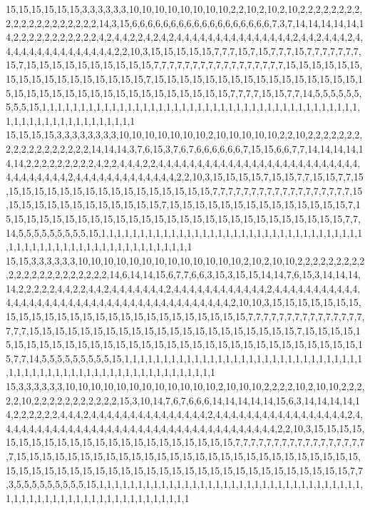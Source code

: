 15,15,15,15,15,15,3,3,3,3,3,3,10,10,10,10,10,10,10,10,2,2,10,2,10,2,10,2,2,2,2,2,2,2,2,2,2,2,2,2,2,2,2,2,2,2,2,14,3,15,6,6,6,6,6,6,6,6,6,6,6,6,6,6,6,6,6,6,7,3,7,14,14,14,14,14,14,2,2,2,2,2,2,2,2,2,2,2,4,2,4,4,2,2,4,2,4,2,4,4,4,4,4,4,4,4,4,4,4,4,4,4,4,2,4,4,2,4,4,4,2,4,4,4,4,4,4,4,4,4,4,4,4,4,4,4,2,2,10,3,15,15,15,15,15,7,7,7,15,7,15,7,7,7,15,7,7,7,7,7,7,7,15,7,15,15,15,15,15,15,15,15,15,15,7,7,7,7,7,7,7,7,7,7,7,7,7,7,7,7,7,15,15,15,15,15,15,15,15,15,15,15,15,15,15,15,15,15,7,15,15,15,15,15,15,15,15,15,15,15,15,15,15,15,15,15,15,15,15,15,15,15,15,15,15,15,15,15,15,15,15,15,15,7,7,7,7,15,15,7,7,14,5,5,5,5,5,5,5,5,5,15,1,1,1,1,1,1,1,1,1,1,1,1,1,1,1,1,1,1,1,1,1,1,1,1,1,1,1,1,1,1,1,1,1,1,1,1,1,1,1,1,1,1,1,1,1,1,1,1,1,1,1,1,1,1,1,1,1,1
15,15,15,15,3,3,3,3,3,3,3,3,10,10,10,10,10,10,10,2,10,10,10,10,10,2,2,10,2,2,2,2,2,2,2,2,2,2,2,2,2,2,2,2,2,2,14,14,14,3,7,6,15,3,7,6,7,6,6,6,6,6,6,7,15,15,6,6,7,7,14,14,14,14,14,14,2,2,2,2,2,2,2,2,2,4,2,2,4,4,4,2,2,4,4,4,4,4,4,4,4,4,4,4,4,4,4,4,4,4,4,4,4,4,4,4,4,4,4,4,4,4,4,4,4,4,4,2,4,4,4,4,4,4,4,4,4,4,4,4,4,2,2,10,3,15,15,15,15,7,15,15,7,7,15,15,7,7,15,15,15,15,15,15,15,15,15,15,15,15,15,15,15,15,15,7,7,7,7,7,7,7,7,7,7,7,7,7,7,7,7,7,7,15,15,15,15,15,15,15,15,15,15,15,15,15,7,15,15,15,15,15,15,15,15,15,15,15,15,15,15,7,15,15,15,15,15,15,15,15,15,15,15,15,15,15,15,15,15,15,15,15,15,15,15,15,15,15,15,7,7,14,5,5,5,5,5,5,5,5,5,15,1,1,1,1,1,1,1,1,1,1,1,1,1,1,1,1,1,1,1,1,1,1,1,1,1,1,1,1,1,1,1,1,1,1,1,1,1,1,1,1,1,1,1,1,1,1,1,1,1,1,1,1,1,1,1,1,1,1
15,15,3,3,3,3,3,3,10,10,10,10,10,10,10,10,10,10,10,10,10,2,10,2,10,10,2,2,2,2,2,2,2,2,2,2,2,2,2,2,2,2,2,2,2,2,2,2,14,6,14,14,15,6,7,7,6,6,3,15,3,15,15,14,14,7,6,15,3,14,14,14,14,2,2,2,2,2,4,4,2,2,4,4,2,4,4,4,4,4,4,4,2,4,4,4,4,4,4,4,4,4,4,4,4,2,4,4,4,4,4,4,4,4,4,4,4,4,4,4,4,4,4,4,4,4,4,4,4,4,4,4,4,4,4,4,4,4,4,4,4,4,4,4,4,4,2,10,10,3,15,15,15,15,15,15,15,15,15,15,15,15,15,15,15,15,15,15,15,15,15,15,15,15,15,15,7,7,7,7,7,7,7,7,7,7,7,7,7,7,7,7,7,7,15,15,15,15,15,15,15,15,15,15,15,15,15,15,15,15,15,15,15,15,15,7,15,15,15,15,15,15,15,15,15,15,15,15,15,15,15,15,15,15,15,15,15,15,15,15,15,15,15,15,15,15,15,15,15,7,7,14,5,5,5,5,5,5,5,5,5,15,1,1,1,1,1,1,1,1,1,1,1,1,1,1,1,1,1,1,1,1,1,1,1,1,1,1,1,1,1,1,1,1,1,1,1,1,1,1,1,1,1,1,1,1,1,1,1,1,1,1,1,1,1,1,1,1,1,1
15,3,3,3,3,3,3,10,10,10,10,10,10,10,10,10,10,10,10,2,10,10,10,2,2,2,2,10,2,10,10,2,2,2,2,2,10,2,2,2,2,2,2,2,2,2,2,2,15,3,10,14,7,6,7,6,6,6,14,14,14,14,14,15,6,3,14,14,14,14,14,2,2,2,2,2,2,4,4,4,2,4,4,4,4,4,4,4,4,4,4,4,4,4,4,4,2,4,4,4,4,4,4,4,4,4,4,4,4,4,4,4,4,4,2,4,4,4,4,4,4,4,4,4,4,4,4,4,4,4,4,4,4,4,4,4,4,4,4,4,4,4,4,4,4,4,4,4,4,4,4,2,2,10,3,15,15,15,15,15,15,15,15,15,15,15,15,15,15,15,15,15,15,15,15,15,15,7,7,7,7,7,7,7,7,7,7,7,7,7,7,7,7,7,7,15,15,15,15,15,15,15,15,15,15,15,15,15,15,15,15,15,15,15,15,15,15,15,15,15,15,15,15,15,15,15,15,15,15,15,15,15,15,15,15,15,15,15,15,15,15,15,15,15,15,15,15,15,15,7,7,3,5,5,5,5,5,5,5,5,5,15,1,1,1,1,1,1,1,1,1,1,1,1,1,1,1,1,1,1,1,1,1,1,1,1,1,1,1,1,1,1,1,1,1,1,1,1,1,1,1,1,1,1,1,1,1,1,1,1,1,1,1,1,1,1,1,1,1,1
